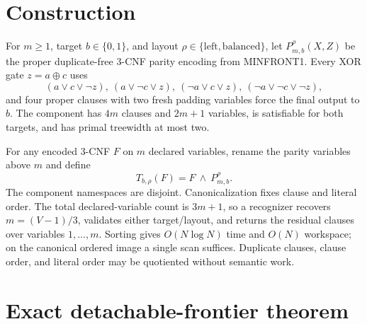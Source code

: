 \documentclass[11pt]{article}
\begin{document}
\section{Construction}

For \(m\ge1\), target \(b\in\{0,1\}\), and layout
\(\rho\in\{\text{left},\text{balanced}\}\), let
\(P_{m,b}^{\rho}(X,Z)\) be the proper duplicate-free 3-CNF parity encoding
from MINFRONT1.  Every XOR gate \(z=a\oplus c\) uses
\[
(a\vee c\vee\neg z),\ (a\vee\neg c\vee z),\
(\neg a\vee c\vee z),\ (\neg a\vee\neg c\vee\neg z),
\]
and four proper clauses with two fresh padding variables force the final
output to \(b\).  The component has \(4m\) clauses and \(2m+1\) variables,
is satisfiable for both targets, and has primal treewidth at most two.

For any encoded 3-CNF \(F\) on \(m\) declared variables, rename the parity
variables above \(m\) and define
\[
 T_{b,\rho}(F)=F\ \wedge\ P_{m,b}^{\rho}.
\]
The component namespaces are disjoint.  Canonicalization fixes clause and
literal order.  The total declared-variable count is \(3m+1\), so a recognizer
recovers \(m=(V-1)/3\), validates either target/layout, and returns the
residual clauses over variables \(1,\ldots,m\).  Sorting gives
\(O(N\log N)\) time and \(O(N)\) workspace; on the canonical ordered image a
single scan suffices.  Duplicate clauses, clause order, and literal order may
be quotiented without semantic work.

\section{Exact detachable-frontier theorem}
\end{document}
